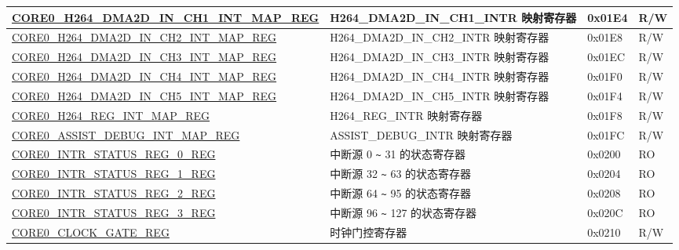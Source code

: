 \begin{longtable}{ | p{8.7cm} | p{6.2cm} | p{1.3cm} | p{1cm} | }
\hyperref[regdesc:CORE0H264DMA2DINCH1INTMAPREG]{CORE0\_H264\_DMA2D\_IN\_CH1\_INT\_MAP\_REG} & H264\_DMA2D\_IN\_CH1\_INTR 映射寄存器 & 0x01E4 & R/W \\ \hline

\hyperref[regdesc:CORE0H264DMA2DINCH2INTMAPREG]{CORE0\_H264\_DMA2D\_IN\_CH2\_INT\_MAP\_REG} & H264\_DMA2D\_IN\_CH2\_INTR 映射寄存器 & 0x01E8 & R/W \\ \hline

\hyperref[regdesc:CORE0H264DMA2DINCH3INTMAPREG]{CORE0\_H264\_DMA2D\_IN\_CH3\_INT\_MAP\_REG} & H264\_DMA2D\_IN\_CH3\_INTR 映射寄存器 & 0x01EC & R/W \\ \hline

\hyperref[regdesc:CORE0H264DMA2DINCH4INTMAPREG]{CORE0\_H264\_DMA2D\_IN\_CH4\_INT\_MAP\_REG} & H264\_DMA2D\_IN\_CH4\_INTR 映射寄存器 & 0x01F0 & R/W \\ \hline

\hyperref[regdesc:CORE0H264DMA2DINCH5INTMAPREG]{CORE0\_H264\_DMA2D\_IN\_CH5\_INT\_MAP\_REG} & H264\_DMA2D\_IN\_CH5\_INTR 映射寄存器 & 0x01F4 & R/W \\ \hline

\hyperref[regdesc:CORE0H264REGINTMAPREG]{CORE0\_H264\_REG\_INT\_MAP\_REG} & H264\_REG\_INTR 映射寄存器 & 0x01F8 & R/W \\ \hline

\hyperref[regdesc:CORE0ASSISTDEBUGINTMAPREG]{CORE0\_ASSIST\_DEBUG\_INT\_MAP\_REG} & ASSIST\_DEBUG\_INTR 映射寄存器 & 0x01FC & R/W \\ \hline

\hyperref[regdesc:CORE0INTRSTATUSREG0REG]{CORE0\_INTR\_STATUS\_REG\_0\_REG} & 中断源 0 \verb+~+ 31 的状态寄存器 & 0x0200 & RO \\ \hline

\hyperref[regdesc:CORE0INTRSTATUSREG1REG]{CORE0\_INTR\_STATUS\_REG\_1\_REG} & 中断源 32 \verb+~+ 63 的状态寄存器 & 0x0204 & RO \\ \hline

\hyperref[regdesc:CORE0INTRSTATUSREG2REG]{CORE0\_INTR\_STATUS\_REG\_2\_REG} & 中断源 64 \verb+~+ 95 的状态寄存器 & 0x0208 & RO \\ \hline

\hyperref[regdesc:CORE0INTRSTATUSREG3REG]{CORE0\_INTR\_STATUS\_REG\_3\_REG} & 中断源 96 \verb+~+ 127 的状态寄存器 & 0x020C & RO \\ \hline

\hyperref[regdesc:CORE0CLOCKGATEREG]{CORE0\_CLOCK\_GATE\_REG} & 时钟门控寄存器 & 0x0210 & R/W \\ \hline



\end{longtable}
